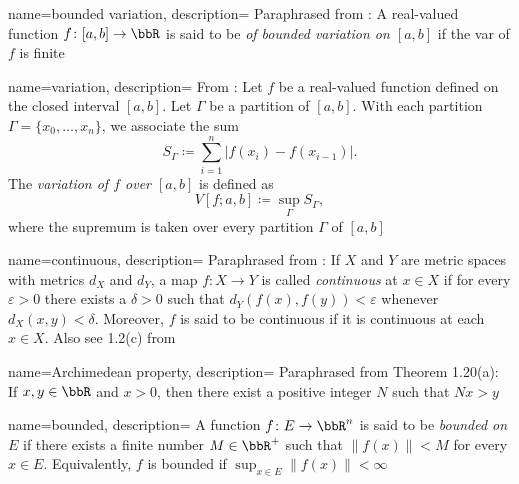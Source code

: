 
%
{%
  name={bounded variation},%
  description={%
    Paraphrased from \cite[Ch.\@ 2\S1, p.\@ 17]{wheeden-zygmund}: A
    real-valued function $f\colon[a,b]\to\bbR$ is said to be \emph{of
      bounded variation on $[a,b]$} if the \gls{var} of $f$ is
    finite%
  }%
}%

%
{%
  name={variation},%
  description={%
    From \cite[Ch.\@ 2\S1, p.\@ 17]{wheeden-zygmund}: Let $f$ be a
    real-valued function defined on the closed interval $[a,b]$. Let
    $\Gamma$ be a partition of $[a,b]$. With each partition
    $\Gamma=\{x_0,\dotsc,x_n\}$, we associate the sum
    \[
      S_\Gamma\coloneq\sum_{i=1}^n|f(x_i)-f(x_{i-1})|.
    \]
    The \emph{variation of $f$ over $[a,b]$} is defined as
    \[
      V[f;a,b]\coloneq\sup_{\Gamma}S_\Gamma,
    \]
    where the supremum is taken over every partition $\Gamma$ of $[a,b]$%
  }%
}%

%
{%
  name={continuous},%
  description={%
    Paraphrased from \cite[Ch.\@ P\S6, p.\@ 14]{folland}: If $X$ and $Y$
    are metric spaces with metrics $d_X$ and $d_Y$, a map $f\colon X\to Y$
    is called \emph{continuous} at $x\in X$ if for every $\varepsilon>0$
    there exists a $\delta>0$ such that $d_Y(f(x),f(y))<\varepsilon$
    whenever $d_X(x,y)<\delta$. Moreover, $f$ is said to be continuous if
    it is continuous at each $x\in X$. Also see 1.2(c) from \cite[Ch.\@ 1,
    p.\@ 8]{rudin-2}%
  }%
}

%
{%
  name={Archimedean property},%
  description={%
    Paraphrased from \cite[Ch.\@ 1, p.\@ 9]{rudin-1} Theorem 1.20(a): If
    $x,y\in\bbR$ and $x>0$, then there exist a positive integer $N$ such
    that $Nx>y$%
  }%
}

%
{%
  name={bounded},%
  description={%
    A function $f\colon E\to\bbR^n$ is said to be \emph{bounded on $E$} if
    there exists a finite number $M\in\bbR^+$ such that $\|f(x)\|<M$ for
    every $x\in E$. Equivalently, $f$ is bounded if $\sup_{x\in
      E}\|f(x)\|<\infty$%
  }%
}

